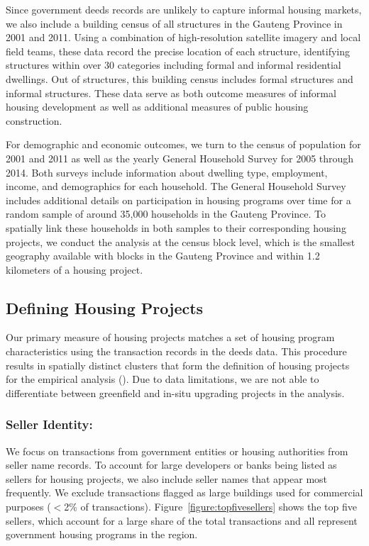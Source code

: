 \documentclass[12pt]{article}
\begin{document}
Since government deeds records are unlikely to capture informal housing markets, we also include a building census of all structures in the Gauteng Province in 2001 and 2011.  Using a combination of high-resolution satellite imagery and local field teams, these data record the precise location of each structure, identifying structures within over 30 categories including formal and informal residential dwellings.  Out of structures, this building census includes formal structures and informal structures.  These data serve as both outcome measures of informal housing development as well as additional measures of public housing construction.

For demographic and economic outcomes, we turn to the census of population for 2001 and 2011 as well as the yearly General Household Survey for 2005 through 2014.  Both surveys include information about dwelling type, employment, income, and demographics for each household.  The General Household Survey includes additional details on participation in housing programs over time for a random sample of around 35,000 households in the Gauteng Province.  To spatially link these households in both samples to their corresponding housing projects, we conduct the analysis at the census block level, which is the smallest geography available with blocks in the Gauteng Province and within 1.2 kilometers of a housing project.  

\subsection{Defining Housing Projects}

Our primary measure of housing projects matches a set of housing program characteristics using the transaction records in the deeds data.  This procedure results in spatially distinct clusters that form the definition of housing projects for the empirical analysis (\cite{serihistory}).  Due to data limitations, we are not able to differentiate between greenfield and in-situ upgrading projects in the analysis.

\subsubsection{Seller Identity:}
We focus on transactions from government entities or housing authorities from seller name records.  To account for large developers or banks being listed as sellers for housing projects, we also include seller names that appear most frequently.  We exclude transactions flagged as large buildings used for commercial purposes ($<$2\% of transactions).  Figure~\ref{figure:topfivesellers} shows the top five sellers, which account for a large share of the total transactions and all represent government housing programs in the region.  
\end{document}
